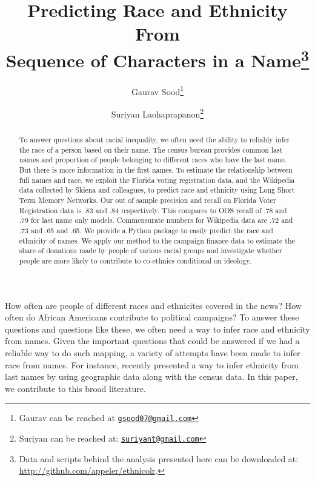 \documentclass[12pt, letterpaper]{article}
\title{\Large{Predicting Race and Ethnicity From\\Sequence of Characters in a Name}\footnote{Data and scripts behind the analysis presented here can be downloaded at: \url{http://github.com/appeler/ethnicolr}.
}}
\author{Gaurav Sood\thanks{Gaurav can be reached at \href{mailto:gsood07@gmail.com}{\footnotesize{\texttt{gsood07@gmail.com}}}} \and Suriyan Laohaprapanon\thanks{Suriyan can be reached at: \href{mailto:suriyant@gmail.com}{\footnotesize{\texttt{suriyant@gmail.com}}}}\vspace{.5cm}}
\date{}
\begin{document}
\maketitle

\begin{center}
\end{center}

\begin{comment}

setwd(paste0(githubdir, "ethnicolr_paper/"))
tools::texi2dvi("name_race.tex", pdf = TRUE, clean = TRUE) 
setwd(basedir)

\end{comment}


\begin{abstract}
To answer questions about racial inequality, we often need the ability to reliably infer the race of a person based on their name. The census bureau provides common last names and proportion of people belonging to different races who have the last name. But there is more information in the first names. To estimate the relationship between full names and race, we exploit the Florida voting registration data, and the Wikipedia data collected by Skiena and colleagues, to predict race and ethnicity using Long Short Term Memory Networks. Our out of sample precision and recall on Florida Voter Registration data is .83 and .84 respectively. This compares to OOS recall of .78 and .79 for last name only models. Commensurate numbers for Wikipedia data are .72 and .73 and .65 and .65. We provide a Python package to easily predict the race and ethnicity of names. We apply our method to the campaign finance data to estimate the share of donations made by people of various racial groups and investigate whether people are more likely to contribute to co-ethnics conditional on ideology.
\end{abstract}
\clearpage
\doublespace

How often are people of different races and ethnicites covered in the news? How often do African Americans contribute to political campaigns? To answer these questions and questions like these, we often need a way to infer race and ethnicity from names. Given the important questions that could be answered if we had a reliable way to do such mapping, a variety of attempts have been made to infer race from names. For instance, recently \citet{imai2016improving} presented a way to infer ethnicity from last names by using geographic data along with the census data. In this paper, we contribute to this broad literature. 
\end{document}
